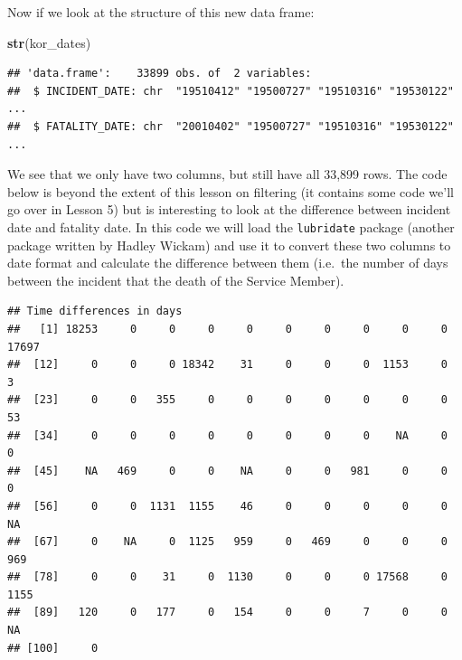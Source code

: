 \documentclass[]{book}
\newenvironment{Shaded}{\begin{snugshade}}{\end{snugshade}}
\newcommand{\KeywordTok}[1]{\textcolor[rgb]{0.13,0.29,0.53}{\textbf{{#1}}}}
\newcommand{\DecValTok}[1]{\textcolor[rgb]{0.00,0.00,0.81}{{#1}}}
\newcommand{\StringTok}[1]{\textcolor[rgb]{0.31,0.60,0.02}{{#1}}}
\newcommand{\NormalTok}[1]{{#1}}
\begin{document}
Now if we look at the structure of this new data frame:

\begin{Shaded}
\begin{Highlighting}[]
\KeywordTok{str}\NormalTok{(kor_dates)}
\end{Highlighting}
\end{Shaded}

\begin{verbatim}
## 'data.frame':    33899 obs. of  2 variables:
##  $ INCIDENT_DATE: chr  "19510412" "19500727" "19510316" "19530122" ...
##  $ FATALITY_DATE: chr  "20010402" "19500727" "19510316" "19530122" ...
\end{verbatim}

We see that we only have two columns, but still have all 33,899 rows.
The code below is beyond the extent of this lesson on filtering (it
contains some code we'll go over in Lesson 5) but is interesting to look
at the difference between incident date and fatality date. In this code
we will load the \texttt{lubridate} package \citep{R-lubridate} (another
package written by Hadley Wickam) and use it to convert these two
columns to date format and calculate the difference between them
(i.e.~the number of days between the incident that the death of the
Service Member).

\begin{Shaded}
\end{Shaded}

\begin{verbatim}
## Time differences in days
##   [1] 18253     0     0     0     0     0     0     0     0     0 17697
##  [12]     0     0     0 18342    31     0     0     0  1153     0     3
##  [23]     0     0   355     0     0     0     0     0     0     0    53
##  [34]     0     0     0     0     0     0     0     0    NA     0     0
##  [45]    NA   469     0     0    NA     0     0   981     0     0     0
##  [56]     0     0  1131  1155    46     0     0     0     0     0    NA
##  [67]     0    NA     0  1125   959     0   469     0     0     0   969
##  [78]     0     0    31     0  1130     0     0     0 17568     0  1155
##  [89]   120     0   177     0   154     0     0     7     0     0    NA
## [100]     0
\end{verbatim}
\end{document}
